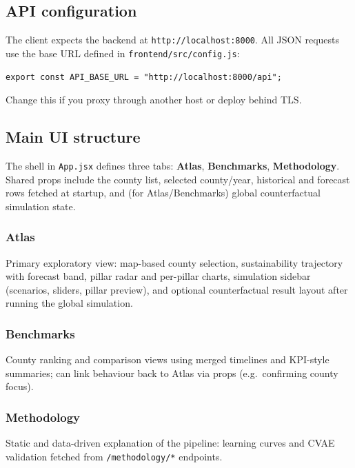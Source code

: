 \documentclass[11pt,a4paper]{article}
\begin{document}
\subsection{API configuration}
The client expects the backend at \texttt{http://localhost:8000}. All JSON requests use the base URL defined in \texttt{frontend/src/config.js}:
\begin{verbatim}
export const API_BASE_URL = "http://localhost:8000/api";
\end{verbatim}
Change this if you proxy through another host or deploy behind TLS.

\subsection{Main UI structure}
The shell in \texttt{App.jsx} defines three tabs: \textbf{Atlas}, \textbf{Benchmarks}, \textbf{Methodology}. Shared props include the county list, selected county/year, historical and forecast rows fetched at startup, and (for Atlas/Benchmarks) global counterfactual simulation state.

\subsubsection{Atlas}
Primary exploratory view: map-based county selection, sustainability trajectory with forecast band, pillar radar and per-pillar charts, simulation sidebar (scenarios, sliders, pillar preview), and optional counterfactual result layout after running the global simulation.

\subsubsection{Benchmarks}
County ranking and comparison views using merged timelines and KPI-style summaries; can link behaviour back to Atlas via props (e.g.\ confirming county focus).

\subsubsection{Methodology}
Static and data-driven explanation of the pipeline: learning curves and CVAE validation fetched from \texttt{/methodology/*} endpoints.
\end{document}
